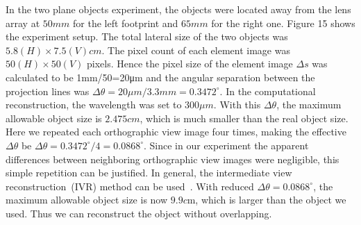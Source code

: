 \documentclass[10pt,letterpaper]{article}
\begin{document}
In the two plane objects experiment, the objects were located away from the lens array at $50mm$ for the left footprint and $65mm$ for the right one. Figure 15 shows the experiment setup. The total lateral size of the two objects was $5.8(H) \times7.5(V)cm$. The pixel count of each element image was $50(H) \times50(V)$ pixels. Hence the pixel size of the element image $\Delta s$ was calculated to be 1mm/50=20μm and the angular separation between the projection lines was $\Delta\theta=20μm/3.3mm=0.3472^\circ$. In the computational reconstruction, the wavelength was set to $300μm$. With this $\Delta\theta$, the maximum allowable object size is $2.475cm$, which is much smaller than the real object size. Here we repeated each orthographic view image four times, making the effective $\Delta\theta$ be $\Delta\theta=0.3472^\circ/4=0.0868^\circ$. Since in our experiment the apparent differences between neighboring orthographic view images were negligible, this simple repetition can be justified. In general, the intermediate view reconstruction~(IVR) method can be used~\cite{Park_2008_OE,Zhang_2006_CSVT}. With reduced $\Delta\theta=0.0868^\circ$, the maximum allowable object size is now $9.9c$m, which is larger than the object we used. Thus we can reconstruct the object without overlapping.
\end{document}
